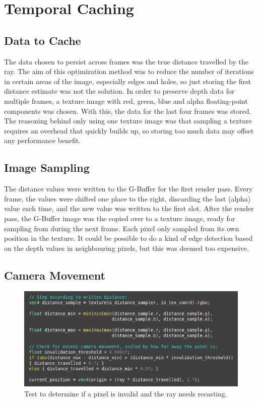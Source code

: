 \section{Temporal Caching}

\subsection{Data to Cache}

The data chosen to persist across frames was the true distance travelled by the ray. The aim of this optimization method was to reduce the number of iterations in certain areas of the image, especially edges and holes, so just storing the first distance estimate was not the solution. In order to preserve depth data for multiple frames, a texture image with red, green, blue and alpha floating-point components was chosen. With this, the data for the last four frames was stored. The reasoning behind only using one texture image was that sampling a texture requires an overhead that quickly builds up, so storing too much data may offset any performance benefit.

\subsection{Image Sampling}

The distance values were written to the G-Buffer for the first render pass. Every frame, the values were shifted one place to the right, discarding the last (alpha) value each time, and the new value was written to the first slot. After the render pass, the G-Buffer image was the copied over to a texture image, ready for sampling from during the next frame. Each pixel only sampled from its own position in the texture. It could be possible to do a kind of edge detection based on the depth values in neighbouring pixels, but this was deemed too expensive.

\subsection{Camera Movement}

\begin{figure}[ht]
	\centering
	\includegraphics[width=0.65\linewidth, frame]{Images/Distance-Test.png}
	\caption{Test to determine if a pixel is invalid and the ray needs recasting.}
	\label{figure:distance-test}
\end{figure}

